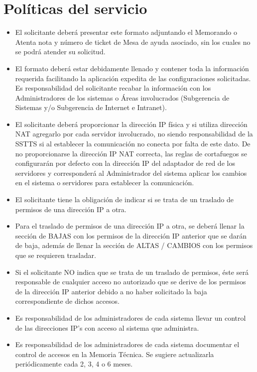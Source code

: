 \documentclass[a4paper]{article}
\begin{document}
\section*{Políticas del servicio}
{\small \begin{itemize}
	        \item El solicitante deberá presentar este formato adjuntando el Memorando o Atenta nota y número de ticket de Mesa de ayuda asociado, sin los cuales no se podrá atender su solicitud.  
	        \item El formato deberá estar debidamente llenado y contener toda la información requerida facilitando la aplicación expedita de las configuraciones solicitadas. Es responsabilidad del solicitante recabar la información con los Administradores de los sistemas o Áreas involucrados (Subgerencia de Sistemas y/o Subgerencia de Internet e Intranet).
           \item El solicitante deberá proporcionar la dirección IP física y si utiliza dirección NAT agregarlo por cada servidor involucrado, no siendo responsabilidad de la SSTTS si al establecer la comunicación no conecta por falta de este dato. De no proporcionarse la dirección IP NAT correcta, las reglas de cortafuegos se configurarán por defecto con la dirección IP del adaptador de red de los servidores y corresponderá al Administrador del sistema aplicar los cambios en el sistema o servidores para establecer la comunicación.
           \item El solicitante tiene la obligación de indicar si se trata de un traslado de permisos de una dirección IP a otra.
           \item Para el traslado de permisos de una dirección IP a otra, se deberá llenar la sección de BAJAS con los permisos de la dirección IP anterior que se darán de baja, además de llenar la sección de ALTAS / CAMBIOS con los permisos que se requieren trasladar.
           \item Si el solicitante NO indica que se trata de un traslado de permisos, éste será responsable de cualquier acceso no autorizado que se derive de los permisos de la dirección IP anterior debido a no haber solicitado la baja correspondiente de dichos accesos.
           \item Es responsabilidad de los administradores de cada sistema llevar un control de las direcciones IP’s con acceso al sistema que administra.
           \item Es responsabilidad de los administradores de cada sistema documentar el control de accesos en la Memoria Técnica. Se sugiere actualizarla periódicamente cada 2, 3, 4 o 6 meses.

\end{itemize}}
\end{document}

